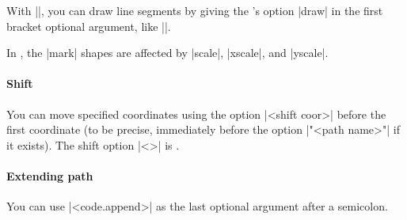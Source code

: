 With |\tzplot*|, you can draw line segments by giving the \Tikz's option |draw| in the first bracket optional argument, like |\tzplot*[draw]|.

\begin{tzcode}{.3}
\end{tzcode}

\remark In \Tikz, the |mark| shapes are affected by |scale|, |xscale|, and |yscale|.

\begin{tzcode}{.3}
\end{tzcode}

\paragraph{Shift}
You can move specified coordinates using the option |<shift coor>| before the first coordinate (to be precise, immediately before the option |"<path name>"| if it exists).
The  shift option |<>| is .


\begin{tzcode}{.3}
\end{tzcode}

\paragraph{Extending path}
You can use |<code.append>| as the last optional argument after a semicolon.


